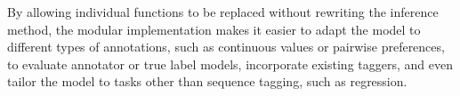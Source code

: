 By allowing individual functions to be replaced without rewriting the inference
method, the modular implementation makes it easier to adapt the model to different types of annotations, 
such as continuous values or pairwise preferences,
to evaluate annotator or true label models, incorporate existing taggers,
and even tailor the model to tasks other than sequence tagging, 
such as regression.

%
